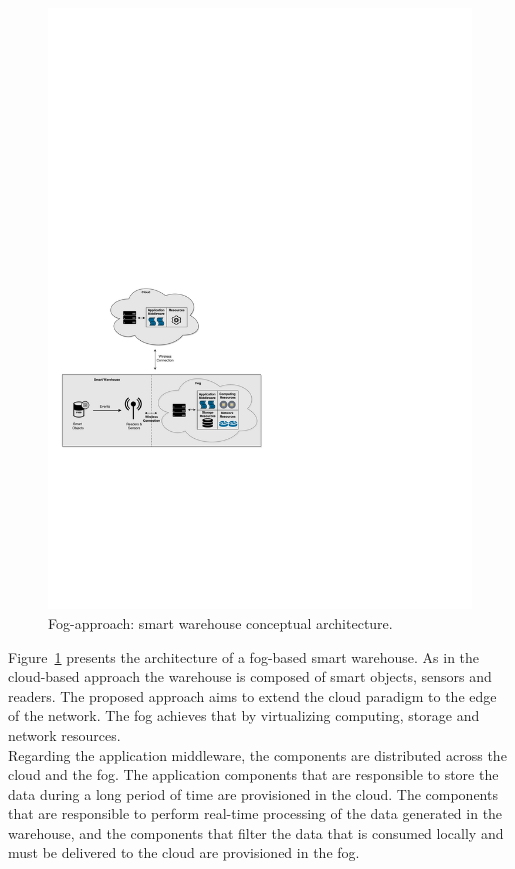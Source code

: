 \begin{figure}[ht!]
  \centering
  \includegraphics[width=\textwidth]{./images/solution_fog_architecture}
  \caption{Fog-approach: smart warehouse conceptual architecture.}
  \label{fig:solution_fog_architecture}
\end{figure}

Figure~\ref{fig:solution_fog_architecture} presents the architecture of a fog-based smart warehouse.
As in the cloud-based approach the warehouse is composed of smart objects, sensors and readers.
The proposed approach aims to extend the cloud paradigm to the edge of the network. The fog achieves
that by virtualizing computing, storage and network resources.\\

Regarding the application middleware, the components are distributed across the cloud and
the fog. The application components that are responsible to store the data during a long period of
time are provisioned in the cloud. The components that are responsible to perform real-time processing
of the data generated in the warehouse, and the components that filter the data that is consumed
locally and must be delivered to the cloud are provisioned in the fog.\\

